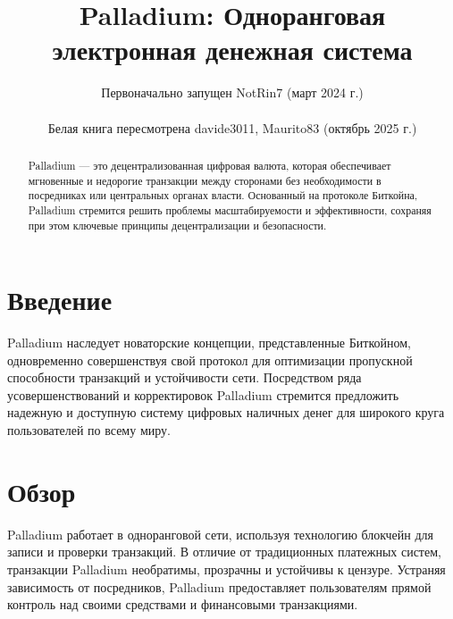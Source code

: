\documentclass[11pt,a4paper]{article}
\title{\textbf{Palladium: Одноранговая электронная денежная система}}
\author{Первоначально запущен NotRin7 (март 2024 г.) \\\\ Белая книга пересмотрена davide3011, Maurito83 (октябрь 2025 г.)}
\date{}
\begin{document}
\maketitle

\begin{abstract}
Palladium — это децентрализованная цифровая валюта, которая обеспечивает мгновенные и недорогие транзакции между сторонами без необходимости в посредниках или центральных органах власти. Основанный на протоколе Биткойна, Palladium стремится решить проблемы масштабируемости и эффективности, сохраняя при этом ключевые принципы децентрализации и безопасности.
\end{abstract}

\section{Введение}
Palladium наследует новаторские концепции, представленные Биткойном, одновременно совершенствуя свой протокол для оптимизации пропускной способности транзакций и устойчивости сети. Посредством ряда усовершенствований и корректировок Palladium стремится предложить надежную и доступную систему цифровых наличных денег для широкого круга пользователей по всему миру.

\section{Обзор}
Palladium работает в одноранговой сети, используя технологию блокчейн для записи и проверки транзакций. В отличие от традиционных платежных систем, транзакции Palladium необратимы, прозрачны и устойчивы к цензуре. Устраняя зависимость от посредников, Palladium предоставляет пользователям прямой контроль над своими средствами и финансовыми транзакциями.
\end{document}
